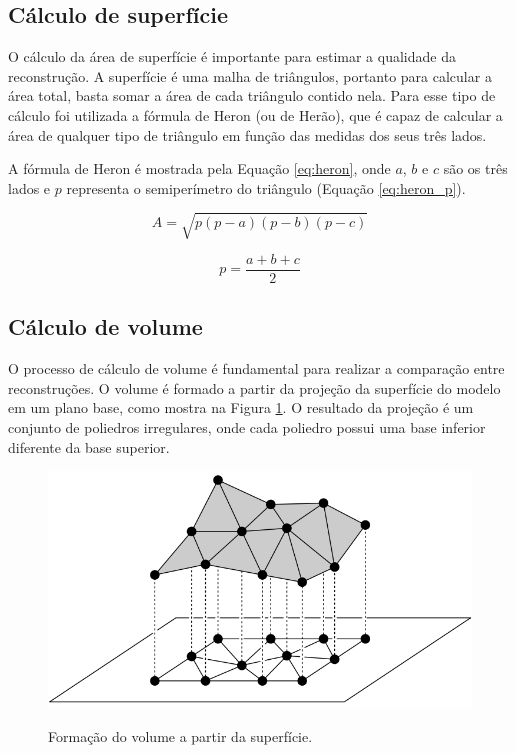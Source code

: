\subsection{Cálculo de superfície}
\label{sec:surface_calc}

O cálculo da área de superfície é importante para estimar a qualidade da reconstrução.
A superfície é uma malha de triângulos, portanto para calcular a área total, basta somar a área de cada triângulo contido nela. 
Para esse tipo de cálculo foi utilizada a fórmula de Heron (ou de Herão), que é capaz de calcular a área de qualquer tipo de triângulo em função das medidas dos seus três lados.

A fórmula de Heron é mostrada pela Equação \ref{eq:heron}, onde $a$, $b$ e $c$ são os três lados e $p$ representa o semiperímetro do triângulo (Equação \ref{eq:heron_p}).

\begin{equation}
    \label{eq:heron}
    A = \sqrt{p(p-a)(p-b)(p-c)}
\end{equation}

\begin{equation}
    \label{eq:heron_p}
    p = \frac{a+b+c}{2}
\end{equation}


\subsection{Cálculo de volume}
\label{sec:volume_calc}

O processo de cálculo de volume é fundamental para realizar a comparação entre reconstruções.
O volume é formado a partir da projeção da superfície do modelo em um plano base, como mostra na Figura \ref{fig:prism}.
O resultado da projeção é um conjunto de poliedros irregulares, onde cada poliedro possui uma base inferior diferente da base superior.

\begin{figure}[H]
    \centering
    \caption{Formação do volume a partir da superfície.}
    \includegraphics[scale=0.5]{dados/figuras/prisms.png}
    \label{fig:prism}
\end{figure}

